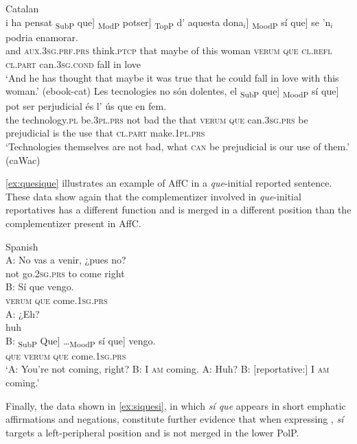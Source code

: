 		\ex \label{ex:embedsiqueb}		
		Catalan\\
		\gll[...] i ha pensat {\ob}\textsubscript{SubP} que]  {\ob}\textsubscript{ModP} potser] {\ob}\textsubscript{TopP} d’ aquesta dona$_i$]  {\ob}\textsubscript{MoodP} sí que] se ’n$_i$ podria enamorar. \\
		{}   and \textsc{aux.3sg.prf.prs} think.\textsc{ptcp} {} that {} maybe {}  of this woman {} \textsc{verum} \textsc{que} \textsc{cl.refl} \textsc{cl.part} can.\textsc{3sg.cond} {fall in love}\\
		\glt `And he has thought that maybe it was true that he could fall in love with this woman.' (ebook-cat)
		\ex \label{ex:embedsiquec}
		 \gll Les tecnologies no són dolentes, el {\ob}\textsubscript{SubP} que]  {\ob}\textsubscript{MoodP} sí que] pot ser perjudicial és l' ús que en fem. \\
		the technology.\textsc{pl} be.\textsc{3pl.prs} not bad the {} that {} \textsc{verum} \textsc{que} can.\textsc{3sg.prs} be prejudicial is the use that \textsc{cl.part} make.\textsc{1pl.prs}\\
		\glt `Technologies themselves are not bad, what \textsc{can} be prejudicial is our use of them.' (caWac) 
			\z 
\z

\eqref{ex:quesique} illustrates an example of AffC in a \emph{que}-initial reported sentence. These data show again that the complementizer involved in \emph{que}-initial reportatives has a different function and is merged in a different position than the complementizer present in AffC. 

\ea\label{ex:quesique} Spanish \\ \gll  A: No vas a venir, {¿pues no?}\\
{} not go.\textsc{2sg.prs} to come right\\
\exi{}\gll B: Sí que vengo.\\
{} \textsc{verum} \textsc{que} come.\textsc{1sg.prs}\\
\exi{}\gll A: ¿Eh?\\
{} huh\\
\exi{}\gll B: {\ob}\textsubscript{SubP} Que] \dots {\ob}\textsubscript{MoodP} sí que] vengo.\\
{} {} \textsc{que} {} \textsc{verum} \textsc{que} come.\textsc{1sg.prs}\\
\glt `A: You're not coming, right? B: I \textsc{am} coming. A: Huh? B: [reportative:] I \textsc{am} coming.'
\z


Finally, the data shown in \eqref{ex:siquesi}, in which  \emph{sí que} appears in short emphatic affirmations and negations, constitute further evidence that when expressing , \emph{sí} targets a left-peripheral position and is not merged in the lower PolP.

